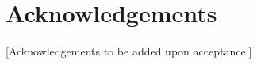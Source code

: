 \documentclass[11pt]{article}
\begin{document}
\section*{Acknowledgements}
[Acknowledgements to be added upon acceptance.]



\end{document}
